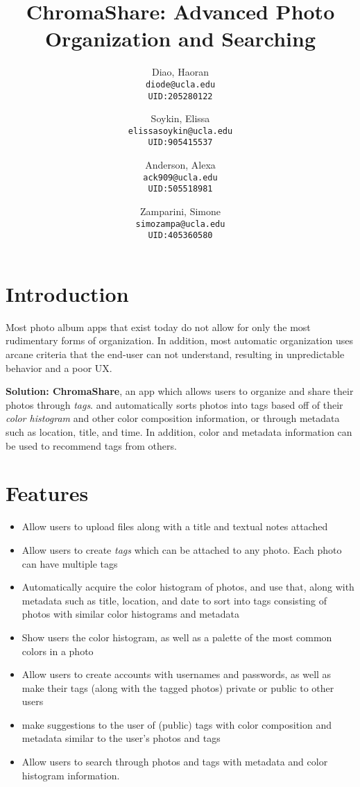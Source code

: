 \documentclass{article}
\title{ChromaShare: Advanced Photo Organization and Searching}
\author {
	Diao, Haoran\\ \texttt{diode@ucla.edu}\\ \texttt{UID:205280122}
	\and
	Soykin, Elissa\\ \texttt{elissasoykin@ucla.edu}\\ \texttt{UID:905415537}
	\and
	Anderson, Alexa\\ \texttt{ack909@ucla.edu}\\ \texttt{UID:505518981}
	\and
	Zamparini, Simone\\ \texttt{simozampa@ucla.edu}\\ \texttt{UID:405360580}
}
\begin{document}
\maketitle
\section{Introduction}
	Most photo album apps that exist today do not allow for only the most
	rudimentary forms of organization. In addition, most automatic
	organization uses arcane criteria that the end-user can not understand,
	resulting in unpredictable behavior and a poor UX.

	\textbf{Solution: ChromaShare}, an app which allows users to organize
	and share their photos through \textit{tags}. and automatically sorts
	photos into tags based off of their \textit{color histogram} and other color
	composition information, or through metadata such as location, title,
	and time. In addition, color and metadata information can be used to
	recommend tags from others.
\section{Features}

	\begin{itemize}
		\item Allow users to upload files along with a title and textual
		notes attached
		\item Allow users to create \textit{tags} which can be attached
		to any photo. Each photo can have multiple tags
		\item Automatically acquire the color histogram of photos, and
		use that, along with metadata such as title, location, and date
		to sort into tags consisting of photos with similar color
		histograms and metadata
		\item Show users the color histogram, as well as a palette of
		the most common colors in a photo
		\item Allow users to create accounts with usernames and
		passwords, as well as make their tags (along with the tagged
		photos) private or public to other users
		\item make suggestions to the user of (public) tags with color
		composition and metadata similar to the user's photos and tags
		\item Allow users to search through photos and tags with
		metadata and color histogram information.
	\end{itemize}
\end{document}
